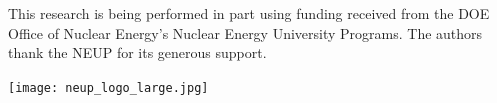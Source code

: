 \documentclass{style}
\begin{document}
This research is being performed in part using funding received from the DOE
Office of Nuclear Energy's Nuclear Energy University Programs.  The authors
thank the NEUP for its generous support.

\begin{center}
\texttt{[image: neup\_logo\_large.jpg]}
\end{center}

\pagebreak




\end{document}
